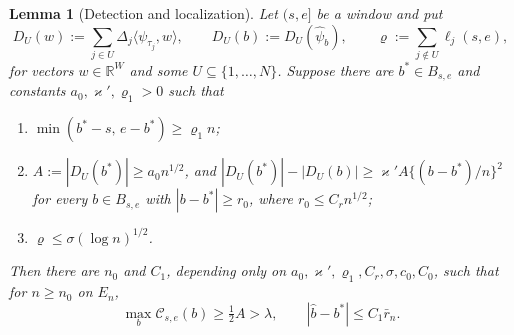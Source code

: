 \documentclass[10pt,a4paper]{amsart}
\newtheorem{lemma}{Lemma}
\begin{document}
\begin{lemma}[Detection and localization]
\label{lem:loc}
Let $(s,e]$ be a window and put
\[
D_U(w):=\sum_{j\in U}\Delta_j\langle\psi_{\tau_j},w\rangle,
\qquad D_U(b):=D_U(\hat\psi_b),
\qquad
\varrho := \sum_{j\notin U}\ell_j(s,e) ,
\]
for vectors $w\in\mathbb R^W$ and some
$U\subseteq\{1,\ldots,N\}$. Suppose there are $b^* \in B_{s,e}$ and constants $a_0, \varkappa', \varrho_1 > 0$ such that
\begin{enumerate}
\item[(i)] $\min(b^*-s,\, e-b^*) \ge \varrho_1 n$;
\item[(ii)] $A := |D_U(b^*)| \ge a_0 n^{1/2}$, and
$|D_U(b^*)| - |D_U(b)| \ge \varkappa' A \{(b-b^*)/n\}^2$
for every $b \in B_{s,e}$ with $|b-b^*| \ge r_0$, where $r_0 \le C_r n^{1/2}$;
\item[(iii)] $\varrho \le \sigma(\log n)^{1/2}$.
\end{enumerate}
Then there are $n_0$ and $C_1$, depending only on $a_0,\varkappa',\varrho_1,C_r,\sigma,c_0,C_0$, such that for $n \ge n_0$ on
$E_n$,
\[
\max_b \mathcal{C}_{s,e}(b) \ge \tfrac12 A > \lambda,
\qquad
|\hat b - b^*| \le C_1 \bar r_n .
\]
\end{lemma}
\end{document}
